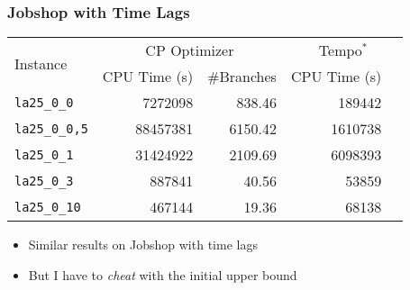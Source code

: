 \begin{frame}
\frametitle{Jobshop with Time Lags}


\vfill

\begin{center}
\begin{footnotesize}
\begin{tabular}{lrrrr}
\toprule
\multirow{2}{*}{Instance}&  \multicolumn{2}{c}{CP Optimizer} & \multicolumn{2}{c}{Tempo$^*$}\\
\cmidrule(rr){2-3}\cmidrule(rr){4-5}
\multicolumn{1}{c}{\#Branches} & \multicolumn{1}{c}{CPU Time (s)} 
& \multicolumn{1}{c}{\#Branches} & \multicolumn{1}{c}{CPU Time (s)} \\
\midrule

\texttt{la25\_0\_0} 
& 7272098 & \cellcolor{red!50}838.46 
& 189442 & \cellcolor{green!50}{26.31}\\
\texttt{la25\_0\_0,5} 
& 88457381 & \cellcolor{red!50}6150.42 
& 1610738 & \cellcolor{green!50}{272.01}\\
\texttt{la25\_0\_1} 
& 31424922 & \cellcolor{red!50}2109.69 
& 6098393 & \cellcolor{green!50}{1173.10}\\
\texttt{la25\_0\_3} 
& 887841 & \cellcolor{red!50}40.56 
& 53859 & \cellcolor{green!50}{6.53}\\
\texttt{la25\_0\_10} 
& 467144 & \cellcolor{red!50}19.36 
& 68138 & \cellcolor{green!50}{9.51}\\
\bottomrule
\end{tabular}
\end{footnotesize}
\end{center}

\vfill

\begin{itemize}
  \item Similar results on Jobshop with time lags

  \vfill\pause
  \item But I have to \emph{cheat} with the initial upper bound
\end{itemize}

\vfill

\end{frame}


